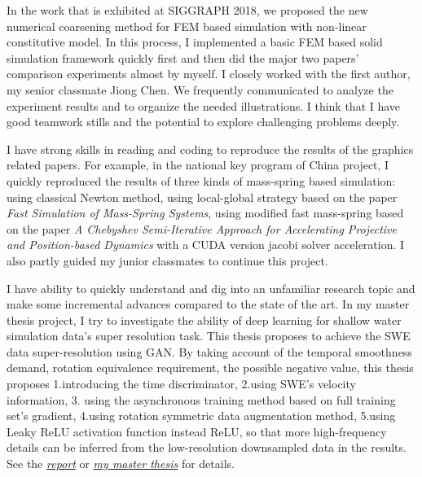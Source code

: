 \documentclass[a4paper,12pt]{article}
\begin{document}
In the work that is exhibited at SIGGRAPH 2018, we proposed the new numerical coarsening method for FEM based simulation with non-linear constitutive model. In this process, I implemented a basic FEM based solid simulation framework quickly first and then did the major two papers' comparison experiments almost by myself. I closely worked with the first author, my senior classmate Jiong Chen. We frequently communicated to analyze the experiment results and to organize the needed illustrations. I think that I have good teamwork stills and the potential to explore challenging problems deeply.\vspace{1.2ex}

I have strong skills in reading and coding to reproduce the results of the graphics related papers. For example, in the national key program of China project, I quickly reproduced the results of three kinds of mass-spring based simulation: using classical Newton method, using local-global strategy based on the paper \textit{Fast Simulation of Mass-Spring Systems}, using modified fast mass-spring based on the paper \textit{A Chebyshev Semi-Iterative Approach for Accelerating Projective and Position-based Dynamics} with a CUDA version jacobi solver acceleration. I also partly guided my junior classmates to continue this project.\vspace{1.2ex} %

I have ability to quickly understand and dig into an unfamiliar research topic and make some incremental advances compared to the state of the art. In my master thesis project, I try to investigate the ability of deep learning for shallow water simulation data's super resolution task. This thesis proposes to achieve the SWE data super-resolution using GAN. By taking account of the temporal smoothness demand, rotation equivalence requirement, the possible negative value, this thesis proposes 1.introducing the time discriminator, 2.using SWE's velocity information, 3. using the asynchronous training method based on full training set's gradient, 4.using rotation symmetric data augmentation method, 5.using Leaky ReLU activation function instead ReLU, so that more high-frequency details can be inferred from the low-resolution downsampled data in the results. See the \textit{\href{https://wtyatzoo.github.io/reports/SWE.pdf}{report}} or \textit{\href{https://wtyatzoo.github.io/thesis/master\_thesis.pdf}{my master thesis}} for details.\vspace{1.2ex}  %
\end{document}
